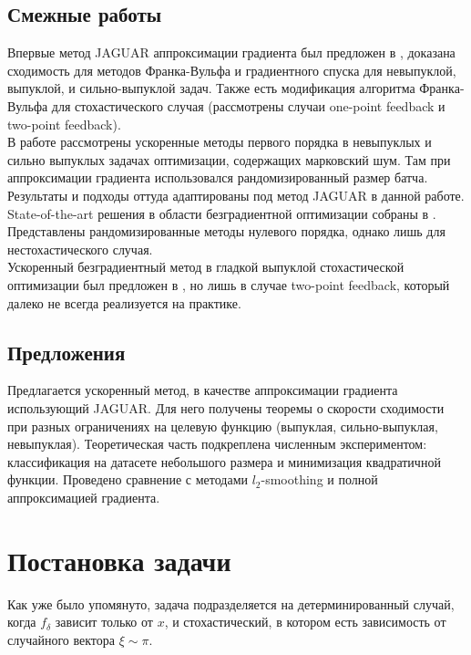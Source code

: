 \documentclass{article}
\begin{document}
\subsection{Смежные работы}
Впервые метод JAGUAR аппроксимации градиента был предложен в \cite{bogdanov2024aspects}, доказана сходимость для методов Франка-Вульфа и градиентного спуска для невыпуклой, выпуклой, и сильно-выпуклой задач. Также есть модификация алгоритма Франка-Вульфа для стохастического случая (рассмотрены случаи one-point feedback и two-point feedback).\\
В работе \cite{beznosikov2023order} рассмотрены ускоренные методы первого порядка в невыпуклых и сильно выпуклых задачах оптимизации, содержащих марковский шум. Там при аппроксимации градиента использовался рандомизированный размер батча. Результаты и подходы оттуда адаптированы под метод JAGUAR в данной работе.\\
State-of-the-art решения в области безградиентной оптимизации собраны в \cite{gasnikov2024randomized}. Представлены рандомизированные методы нулевого порядка, однако лишь для нестохастического случая.\\
Ускоренный безградиентный метод в гладкой выпуклой стохастической оптимизации был предложен в \cite{gorbunov2020accelerated}, но лишь в случае two-point feedback, который далеко не всегда реализуется на практике.
\subsection{Предложения}
Предлагается ускоренный метод, в качестве аппроксимации градиента использующий JAGUAR. Для него получены теоремы о скорости сходимости при разных ограничениях на целевую функцию (выпуклая, сильно-выпуклая, невыпуклая). Теоретическая часть подкреплена численным экспериментом: классификация на датасете небольшого размера и минимизация квадратичной функции. Проведено сравнение с методами $l_2$-smoothing и полной аппроксимацией градиента.


\section{Постановка задачи}
Как уже было упомянуто, задача подразделяется на детерминированный случай, когда $f_\delta$ зависит только от $x$, и стохастический, в котором есть зависимость от случайного вектора $\xi \sim \pi$.
\end{document}
